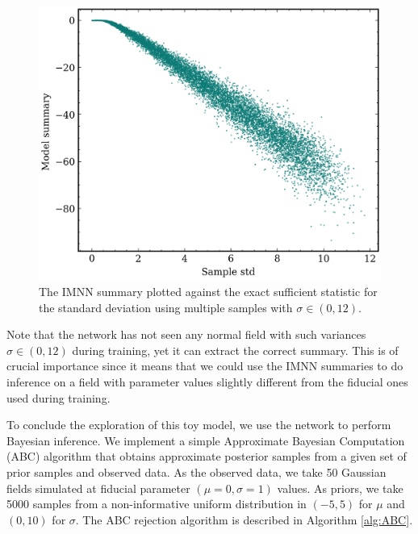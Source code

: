 \begin{figure}
    \centering
    \includegraphics[width=0.75\linewidth]{img/ML/std_vs_model.png}
    \caption{The IMNN summary plotted against the exact sufficient statistic for the standard deviation using multiple samples with $\sigma \in (0,12)$.}
    \label{fig:IMNN normal std}
\end{figure}
Note that the network has not seen any normal field with such variances $\sigma \in (0,12)$ during training, yet it can extract the correct summary. This is of crucial importance since it means that we could use the IMNN summaries to do inference on a field with parameter values slightly different from the fiducial ones used during training.


To conclude the exploration of this toy model, we use the network to perform Bayesian inference. We implement a simple Approximate Bayesian Computation (ABC) \cite{review_ABC} algorithm that obtains approximate posterior samples from a given set of prior samples and observed data. As the observed data, we take 50 Gaussian fields simulated at fiducial parameter $(\mu=0, \sigma=1)$ values. As priors, we take 5000 samples from a non-informative uniform distribution in $(-5, 5)$ for $\mu$ and $(0, 10)$ for $\sigma$. The ABC rejection algorithm is described in Algorithm \ref{alg:ABC}.


